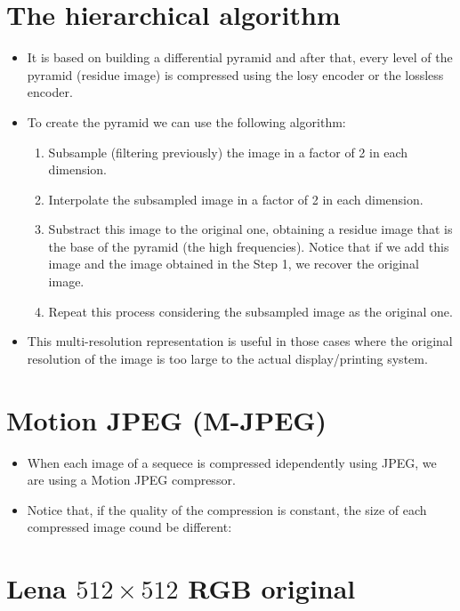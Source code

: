 \section{The hierarchical algorithm}
\begin{itemize}
\item It is based on building a differential pyramid and after that,
  every level of the pyramid (residue image) is compressed using the
  losy encoder or the lossless encoder.
\item To create the pyramid we can use the following algorithm:
  \begin{enumerate}
  \item Subsample (filtering previously) the image in a factor of 2 in
    each dimension.
  \item Interpolate the subsampled image in a factor of 2 in each
    dimension.
  \item Substract this image to the original one, obtaining a residue
    image that is the base of the pyramid (the high
    frequencies). Notice that if we add this image and the image
    obtained in the Step 1, we recover the original image.
  \item Repeat this process considering the subsampled image as the
    original one.
  \end{enumerate}
\item This multi-resolution representation is useful in those cases
  where the original resolution of the image is too large to the
  actual display/printing system.
\end{itemize}

\section{Motion JPEG (M-JPEG)}
\begin{itemize}
\item When each image of a sequece is compressed idependently using
  JPEG, we are using a Motion JPEG compressor.
\item Notice that, if the quality of the compression is constant, the size of each compressed image cound be different:
\end{itemize}
\begin{center}
\end{center}

\section*{Lena $512\times 512$ RGB original}
\begin{center}
\end{center}


